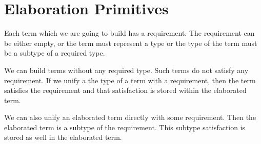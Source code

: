 \section{Elaboration Primitives}

Each term which we are going to build has a requirement. The requirement can be
either empty, or the term must represent a type or the type of the term must be
a subtype of a required type.

We can build terms without any required type. Such terms do not satisfy any
requirement. If we unify a the type of a term with a requirement, then the
term satisfies the requirement and that satisfaction is stored within the
elaborated term.

We can also unify an elaborated term directly with some requirement. Then the
elaborated term is a subtype of the requirement. This subtype satisfaction is
stored as well in the elaborated term.


